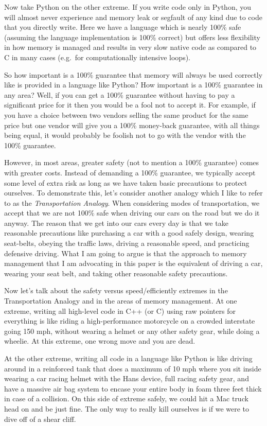 \documentclass[pdf,ps2pdf,11pt]{SANDreport}
\begin{document}
Now take Python on the other extreme.  If you write code only in
Python, you will almost never experience and memory leak or segfault
of any kind due to code that you directly write.  Here we have a
language which is nearly 100\% safe (assuming the language
implementation is 100\% correct) but offers less flexibility in how
memory is managed and results in very slow native code as compared to
C in many cases (e.g.\ for computationally intensive loops).

So how important is a 100\% guarantee that memory will always be used
correctly like is provided in a language like Python?  How important
is a 100\% guarantee in any area?  Well, if you can get a 100\%
guarantee without having to pay a significant price for it then you
would be a fool not to accept it.  For example, if you have a choice
between two vendors selling the same product for the same price but
one vendor will give you a 100\% money-back guarantee, with all things
being equal, it would probably be foolish not to go with the vendor
with the 100\% guarantee.

However, in most areas, greater safety (not to mention a 100\%
guarantee) comes with greater costs.  Instead of demanding a 100\%
guarantee, we typically accept some level of extra risk as long as we
have taken basic precautions to protect ourselves.  To demonstrate
this, let's consider another analogy which I like to refer to as the
{}\textit{Transportation Analogy}.  When considering modes of
transportation, we accept that we are not 100\% safe when driving our
cars on the road but we do it anyway.  The reason that we get into our
cars every day is that we take reasonable precautions like purchasing
a car with a good safely design, wearing seat-belts, obeying the
traffic laws, driving a reasonable speed, and practicing defensive
driving.  What I am going to argue is that the approach to memory
management that I am advocating in this paper is the equivalent of
driving a car, wearing your seat belt, and taking other reasonable
safety precautions.

Now let's talk about the safety versus speed/efficiently extremes in
the Transportation Analogy and in the areas of memory management.  At
one extreme, writing all high-level code in C++ (or C) using raw
pointers for everything is like riding a high-performance motorcycle
on a crowded interstate going 150 mph, without wearing a helmet or
any other safety gear, while doing a wheelie.  At this extreme, one
wrong move and you are dead.

At the other extreme, writing all code in a language like Python is
like driving around in a reinforced tank that does a maximum of 10
mph where you sit inside wearing a car racing helmet with the Hans
device, full racing safety gear, and have a massive air bag system to
encase your entire body in foam three feet thick in case of a
collision.  On this side of extreme safely, we could hit a Mac truck
head on and be just fine.  The only way to really kill ourselves is if
we were to dive off of a shear cliff.
\end{document}
